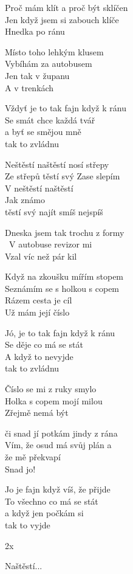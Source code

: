 
\ve{}
Proč mám klít a proč být sklíčen\\
Jen když jsem si zabouch klíče\\
Hnedka po ránu

\ve{}
Místo toho lehkým klusem\\
Vybíhám za autobusem\\
Jen tak v županu\\
A v trenkách 

\re{*:}
Vždyť je to tak fajn když k ránu\\
Se smát chce každá tvář\\
a byť se smějou mně\\
tak to zvládnu 

\cho{}
Neštěstí naštěstí nosí střepy\\
Ze střepů těstí svý Zase slepím\\
V neštěstí naštěstí\\
Jak známo\\
těstí svý najít smíš nejspíš

\ve{}
Dneska jsem tak trochu z formy\\\
V autobuse revizor mi \\
Vzal víc než pár kil

\ve{}
Když na zkoušku mířím stopem\\
Seznámím se s holkou s copem\\
Rázem cesta je cíl\\
Už mám její číslo

\re{*:}
Jó, je to tak fajn když k ránu\\
Se děje co má se stát\\
A když to nevyjde\\
tak to zvládnu 

\cho{}

\ve{}
Číslo se mi z ruky smylo\\
Holka s copem mojí milou\\
Zřejmě nemá být

\ve{}
či snad jí potkám jindy z rána\\
Vím, že osud má svůj plán a\\
že mě překvapí\\
Snad jo!

\re{*:}
Jo je fajn když víš, že přijde\\
To všechno co má se stát\\
a když jen počkám si\\
tak to vyjde 

\cho{}
2x

\re{+ }
Naštěstí...

\esong